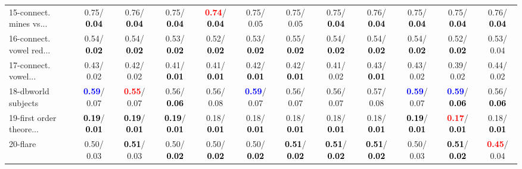 \begin{table}[h]
\begin{center}
{\begin{tabular}{lc|c|c|c|c|c|c|c|c|c|c}
15-connect. mines vs... &   0.75/\textcolor{black}{\textbf{  0.04}} &   0.76/\textcolor{black}{\textbf{  0.04}} &   0.75/\textcolor{black}{\textbf{  0.04}} & \textcolor{red}{\textbf{  0.74}}/\textcolor{black}{\textbf{  0.04}} &   0.75/  0.05 &   0.75/  0.05 &   0.75/\textcolor{black}{\textbf{  0.04}} &   0.76/\textcolor{black}{\textbf{  0.04}} &   0.75/\textcolor{black}{\textbf{  0.04}} &   0.75/\textcolor{black}{\textbf{  0.04}} &   0.76/\textcolor{black}{\textbf{  0.04}} \\
16-connect. vowel red... &   0.54/\textcolor{black}{\textbf{  0.02}} &   0.54/\textcolor{black}{\textbf{  0.02}} &   0.53/\textcolor{black}{\textbf{  0.02}} &   0.52/\textcolor{black}{\textbf{  0.02}} &   0.53/\textcolor{black}{\textbf{  0.02}} &   0.55/\textcolor{black}{\textbf{  0.02}} &   0.54/\textcolor{black}{\textbf{  0.02}} &   0.54/\textcolor{black}{\textbf{  0.02}} &   0.54/\textcolor{black}{\textbf{  0.02}} &   0.52/\textcolor{black}{\textbf{  0.02}} &   0.53/  0.04 \\
17-connect. vowel... &   0.43/  0.02 &   0.42/  0.02 &   0.41/\textcolor{black}{\textbf{  0.01}} &   0.41/\textcolor{black}{\textbf{  0.01}} &   0.42/\textcolor{black}{\textbf{  0.01}} &   0.42/\textcolor{black}{\textbf{  0.01}} &   0.41/  0.02 &   0.43/\textcolor{black}{\textbf{  0.01}} &   0.43/  0.02 &   0.39/  0.02 &   0.44/  0.02 \\
18-dbworld subjects & \textcolor{blue}{\textbf{  0.59}}/  0.07 & \textcolor{red}{\textbf{  0.55}}/  0.07 &   0.56/\textcolor{black}{\textbf{  0.06}} &   0.56/  0.08 & \textcolor{blue}{\textbf{  0.59}}/  0.07 &   0.56/  0.07 &   0.56/  0.07 &   0.57/  0.08 & \textcolor{blue}{\textbf{  0.59}}/  0.07 & \textcolor{blue}{\textbf{  0.59}}/\textcolor{black}{\textbf{  0.06}} &   0.56/\textcolor{black}{\textbf{  0.06}} \\
19-first order theore... & \textcolor{black}{\textbf{  0.19}}/\textcolor{black}{\textbf{  0.01}} & \textcolor{black}{\textbf{  0.19}}/\textcolor{black}{\textbf{  0.01}} & \textcolor{black}{\textbf{  0.19}}/\textcolor{black}{\textbf{  0.01}} &   0.18/\textcolor{black}{\textbf{  0.01}} &   0.18/\textcolor{black}{\textbf{  0.01}} &   0.18/\textcolor{black}{\textbf{  0.01}} &   0.18/\textcolor{black}{\textbf{  0.01}} &   0.18/\textcolor{black}{\textbf{  0.01}} & \textcolor{black}{\textbf{  0.19}}/\textcolor{black}{\textbf{  0.01}} & \textcolor{red}{\textbf{  0.17}}/\textcolor{black}{\textbf{  0.01}} &   0.18/\textcolor{black}{\textbf{  0.01}} \\
20-flare &   0.50/  0.03 & \textcolor{black}{\textbf{  0.51}}/  0.03 &   0.50/\textcolor{black}{\textbf{  0.02}} &   0.50/\textcolor{black}{\textbf{  0.02}} &   0.50/\textcolor{black}{\textbf{  0.02}} & \textcolor{black}{\textbf{  0.51}}/\textcolor{black}{\textbf{  0.02}} & \textcolor{black}{\textbf{  0.51}}/\textcolor{black}{\textbf{  0.02}} & \textcolor{black}{\textbf{  0.51}}/\textcolor{black}{\textbf{  0.02}} &   0.50/  0.03 & \textcolor{black}{\textbf{  0.51}}/\textcolor{black}{\textbf{  0.02}} & \textcolor{red}{\textbf{  0.45}}/  0.04 \\

\end{tabular}}
\end{center}
\end{table}
